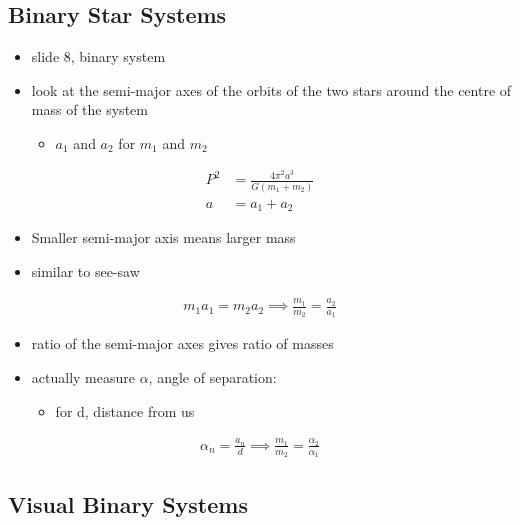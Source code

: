 \documentclass[a4paper,11pt,normalem]{article}
\begin{document}
\section{}
\subsection{Binary Star Systems}
\begin{itemize}
    \item slide 8, binary system
    \item look at the semi-major axes of the orbits of the two stars around the
  centre of mass of the system
        \begin{itemize}
            \item \(a_1\) and \(a_2\) for \(m_1\) and \(m_2\)
        \end{itemize}
\end{itemize}
\begin{align}
    P^2 &= \frac{4\pi^2 a^3}{G(m_1 + m_2)} \\
    a &= a_1 + a_2
\end{align}

\begin{itemize}
    \item Smaller semi-major axis means larger mass
    \item similar to see-saw
\end{itemize}
\begin{align}
    m_1 a_1 = m_2 a_2 \implies \frac{m_1}{m_2} = \frac{a_2}{a_1}
\end{align}

\begin{itemize}
    \item ratio of the semi-major axes gives ratio of masses
    \item actually measure \(\alpha\), angle of separation:
        \begin{itemize}
            \item for d, distance from us
        \end{itemize}
\end{itemize}
\begin{align}
    \alpha_n = \frac{a_n}{d} \implies \frac{m_1}{m_2} = \frac{\alpha_2}{\alpha_1}
\end{align}

\subsection{Visual Binary Systems}
\end{document}
